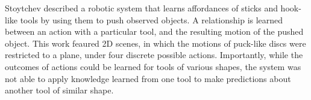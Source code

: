 
Stoytchev \cite{Stoytchev_affordances_2008} described a robotic system
that learns affordances of sticks and hook-like tools by using them to
push observed objects.  A relationship is learned between an action
with a particular tool, and the resulting motion of the pushed
object. This work feaured 2D scenes, in which the motions of
puck-like discs were restricted to a plane, under four discrete
possible actions.
Importantly, while the outcomes of actions could be learned for tools
of various shapes, the system was not able to apply knowledge
learned from one tool to make predictions about another tool of similar shape.

